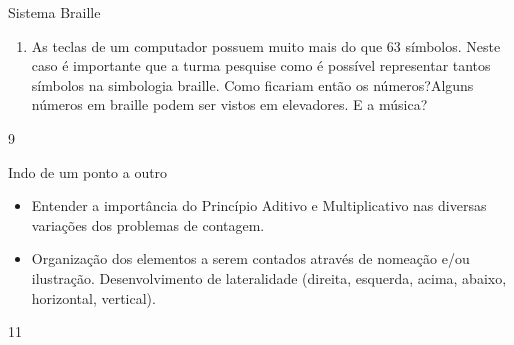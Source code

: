\begin{answer}{Sistema Braille}
{\begin{enumerate}
\item As teclas de um computador possuem muito mais do que $63$ símbolos. Neste caso é importante que a turma pesquise como é possível representar tantos símbolos na simbologia braille. Como ficariam então os números?Alguns números em braille podem ser vistos em elevadores. E a música?            
\end{enumerate}
}{9}
\end{answer}
\clearmargin

\begin{objectives}{Indo de um ponto a outro}
{
\begin{itemize}
\item Entender a importância do Princípio Aditivo e Multiplicativo nas diversas variações dos problemas de contagem. 
\item Organização dos elementos a serem contados através de nomeação e/ou ilustração. Desenvolvimento de lateralidade (direita, esquerda, acima, abaixo, horizontal, vertical).
\end{itemize}
}{1}{1}
\end{objectives}

